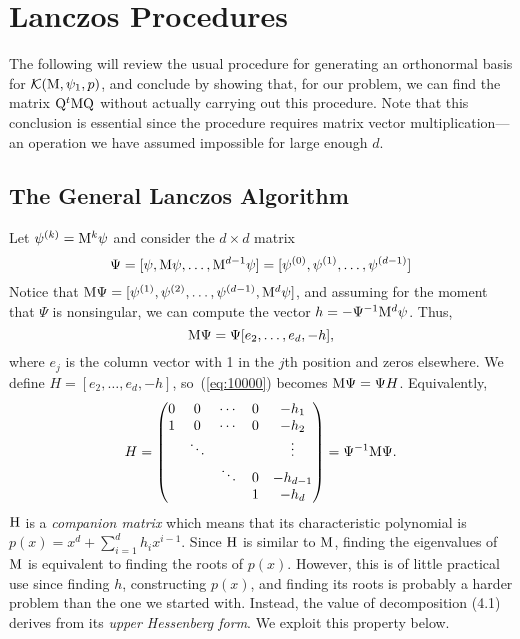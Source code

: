 \chapter{Lanczos Procedures}
\label{cha:lanczos-procedures}
The following will review the usual procedure for generating an orthonormal basis for
$\mathcal{K}(\mathrm{M}, \psi_1, p)$, 
and conclude by showing that, for our problem, we can find the matrix 
$\mathrm{Q}^t\mathrm{M}\mathrm{Q}$
without actually carrying out this procedure. Note that this conclusion is essential since the procedure
requires matrix vector multiplication---an operation we have assumed impossible for large enough $d$.

\section{The General Lanczos Algorithm}
\label{sec:gener-lancz-algor}
Let $\psi^{(k)} =  \mathrm{M}^k \psi$ and consider the $d\times d$ matrix
\[
\Psi = [\psi, \mathrm{M}\psi, \dots, \mathrm{M}^{d-1}\psi] = [\psi^{(0)}, \psi^{(1)}, \dots, \psi^{(d-1)}]
\]
Notice that $\mathrm{M}\Psi = [\psi^{(1)}, \psi^{(2)}, \dots, \psi^{(d-1)}, \mathrm{M}^d \psi]$,
and assuming for the moment that $\Psi$ is nonsingular,
we can compute the vector $h = -\Psi^{-1}\mathrm{M}^d \psi$. Thus,
\begin{equation}
\label{eq:10000}
\mathrm{M}\Psi = \Psi [e_2,\dots,e_d,-h],  
\end{equation}
where $e_j$ is the column vector with 1 in
the $j$th position and zeros elsewhere. We define $H = [e_2,\dots,e_d,-h]$,
so~(\ref{eq:10000}) becomes $\mathrm{M}\Psi = \Psi H$.
%
%
%
%
Equivalently,
\begin{equation}
  \label{eq:4.1}
H = 
\begin{pmatrix}
0 & 0      & \cdots & 0 & -h_1 \\
1 & 0      & \cdots & 0 & -h_2\\
  & \ddots &        &   & \vdots \\
  &        & \ddots & 0 & -h_{d-1}\\
  &        &        & 1 & -h_{d}
\end{pmatrix} = \Psi^{-1} \mathrm{M} \Psi.
\end{equation}
$\mathrm{H}$ is a \emph{companion matrix} which means that its characteristic polynomial
is $p(x) = x^d + \sum_{i=1}^d h_i x^{i-1}$.
Since $\mathrm{H}$ is similar to $\mathrm{M}$, finding the eigenvalues of $\mathrm{M}$ is equivalent to
finding the roots of $p(x)$. However, this is of little practical use since
finding $h$, constructing $p(x)$, and finding its roots is 
probably a harder problem than the one we started with. Instead, the value of decomposition (4.1)
derives from its \emph{upper Hessenberg form}. We exploit this property below.

